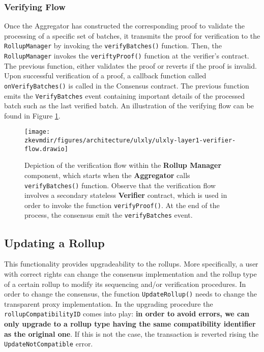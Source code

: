 \subsubsection{Verifying Flow}

Once the Aggregator has constructed the corresponding proof to validate the processing of a specific set of batches, it transmits the proof for verification to the \texttt{RollupManager} by invoking the \texttt{verifyBatches()} function. Then, the \texttt{RollupManager} invokes the \texttt{veriftyProof()} function at the verifier's contract. The previous function, either validates the proof or reverts if the proof is invalid. Upon successful verification of a proof, a callback function called \texttt{onVerifyBatches()} is called in the Consensus contract. The previous function emits the \texttt{VerifyBatches} event containing important details of the processed batch such as the last verified batch. An illustration of the verifying flow can be found in Figure \ref{fig:verifier-flow}.

\vspace{1em}

\begin{figure}[h]
\centering
\texttt{[image: \\zkevmdir/figures/architecture/ulxly/ulxly-layer1-verifier-flow.drawio]}
\caption{Depiction of the verification flow within the \textbf{Rollup Manager} component, which starts when the \textbf{Aggregator} calls \texttt{verifyBatches()} function. Observe that the verification flow involves a secondary stateless \textbf{Verifier} contract, which is used in order to invoke the function \texttt{verifyProof()}. At the end of the process, the consensus emit the \texttt{verifyBatches} event. }
\label{fig:verifier-flow}
\end{figure}



\subsection{Updating a Rollup}

This functionality provides upgradeability to the rollups. More specifically, a user with correct rights can change the consensus implementation and the rollup type of a certain rollup to modify its sequencing and/or verification procedures. In order to change the consensus, the function \texttt{UpdateRollup()} needs to change the transparent proxy implementation. In the upgrading procedure the \texttt{rollupCompatibilityID} comes into play: \textbf{in order to avoid errors, we can only upgrade to a rollup type having the same compatibility identifier as the original one}. If this is not the case, the transaction is reverted rising the \texttt{UpdateNotCompatible} error.




